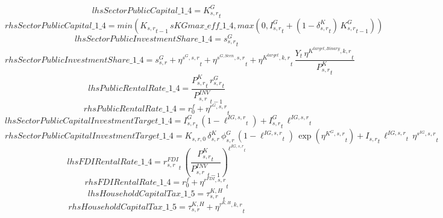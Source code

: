 \begin{dmath*}
lhsSectorPublicCapital\_1\_4 = {{K^G_{s,r}}}_{t}
\end{dmath*}
\begin{dmath*}
rhsSectorPublicCapital\_1\_4 = min({{K_{s,r}}}_{t-1}\, {sKGmax\_eff\_1\_4},max(0,{{I^G_{s,r}}}_{t}+\left(1-{{\delta^{K}_{s,r}}}_{t}\right)\, {{K^G_{s,r}}}_{t-1}))
\end{dmath*}
\begin{dmath*}
lhsSectorPublicInvestmentShare\_1\_4 = {{s^G_{s,r}}}_{t}
\end{dmath*}
\begin{dmath*}
rhsSectorPublicInvestmentShare\_1\_4 = {{s^{G}_{s,r}}}+{{\eta^{s^G,s,r}}}_{t}+{{\eta^{s^{G,Scen},s,r}}}_{t}+{{\eta^{K^{target},k,r}}}_{t}\, \frac{{Y}_{t}\, {{\eta^{K^{target,Binary},k,r}}}_{t}}{{{P^K_{s,r}}}_{t}}
\end{dmath*}
\begin{dmath*}
lhsPublicRentalRate\_1\_4 = \frac{{{P^K_{s,r}}}_{t}\, {{r^G_{s,r}}}_{t}}{{{P^{INV}_{s,r}}}_{t-1}}
\end{dmath*}
\begin{dmath*}
rhsPublicRentalRate\_1\_4 = {{r^f_0}}+{{\eta^{r^G,s,r}}}_{t}
\end{dmath*}
\begin{dmath*}
lhsSectorPublicCapitalInvestmentTarget\_1\_4 = {{I^G_{s,r}}}_{t}\, \left(1-{{\ell^{IG,s,r}}}_{t}\right)+{{I^G_{s,r}}}_{t}\, {{\ell^{IG,s,r}}}_{t}
\end{dmath*}
\begin{dmath*}
rhsSectorPublicCapitalInvestmentTarget\_1\_4 = {{K_{s,r,0}}}\, {{\delta^{K}_{s,r}}}\, {{\phi^{G}_{s,r}}}\, \left(1-{{\ell^{IG,s,r}}}_{t}\right)\, \exp\left({{\eta^{K^G,s,r}}}_{t}\right)+{{I_{s,r}}}_{t}\, {{\ell^{IG,s,r}}}_{t}\, {{\eta^{s^{IG},s,r}}}_{t}
\end{dmath*}
\begin{dmath*}
lhsFDIRentalRate\_1\_4 = {{r^{FDI}_{s,r}}}_{t}\, \left(\frac{{{P^K_{s,r}}}_{t}}{{{P^{INV}_{s,r}}}_{t-1}}\right)^{{{\ell^{IG,s,r}}}_{t}}
\end{dmath*}
\begin{dmath*}
rhsFDIRentalRate\_1\_4 = {{r^f_0}}+{{\eta^{r^{FDI},s,r}}}_{t}
\end{dmath*}
\begin{dmath*}
lhsHouseholdCapitalTax\_1\_5 = {{\tau^{K,H}_{s,r}}}_{t}
\end{dmath*}
\begin{dmath*}
rhsHouseholdCapitalTax\_1\_5 = {{\tau^{K,H}_{s,r}}}+{{\eta^{\tau^{K,H},k,r}}}_{t}
\end{dmath*}
